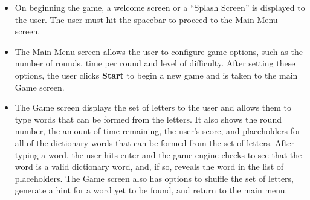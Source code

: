 \begin{itemize}
    \item On beginning the game, a welcome screen or a ``Splash Screen'' is displayed
    to the user. The user must hit the spacebar to proceed to the Main Menu screen.
    \item The Main Menu screen allows the user to configure game options, such as the
    number of rounds, time per round and level of difficulty. After setting these options, the
    user clicks \textbf{Start} to begin a new game and is taken to the main Game screen.
    \item The Game screen displays the set of letters to the user and allows them to type
    words that can be formed from the letters. It also shows the round number, the amount of
    time remaining, the user's score, and placeholders for all of the dictionary words that
    can be formed from the set of letters. After typing a word, the user hits
    enter and the game engine checks to see that the word is a valid dictionary word, and, if so,
    reveals the word in the list of placeholders. The Game screen also has options to shuffle
    the set of letters, generate a hint for a word yet to be found, and return to the main menu.
\end{itemize}

